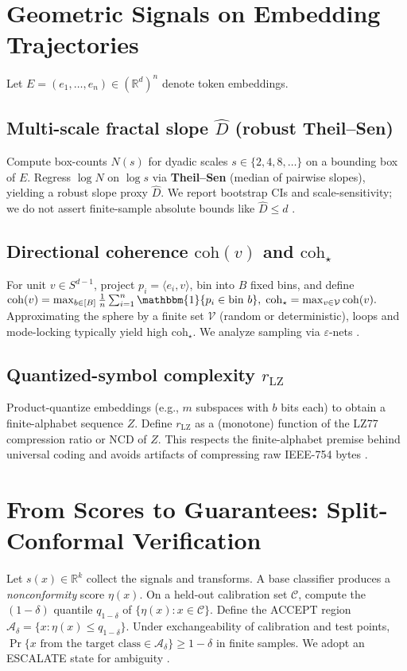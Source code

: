 \documentclass[11pt]{article}
\begin{document}
\section{Geometric Signals on Embedding Trajectories}
Let $E=(e_1,\dots,e_n)\in(\mathbb{R}^d)^n$ denote token embeddings.

\subsection{Multi-scale fractal slope $\hat D$ (robust Theil--Sen)}
Compute box-counts $N(s)$ for dyadic scales $s\in\{2,4,8,\dots\}$ on a bounding box of $E$. Regress $\log N$ on $\log s$ via \textbf{Theil--Sen} (median of pairwise slopes), yielding a robust slope proxy $\hat D$. We report bootstrap CIs and scale-sensitivity; we do not assert finite-sample absolute bounds like $\hat D\le d$ \citep{sen1968}.

\subsection{Directional coherence $\mathrm{coh}(v)$ and $\mathrm{coh}_\star$}
For unit $v\in S^{d-1}$, project $p_i=\langle e_i,v\rangle$, bin into $B$ fixed bins, and define
$
  \mathrm{coh}(v)=\max_{b\in[B]} \frac{1}{n}\sum_{i=1}^n \mathbbm{1}\{p_i\in \text{bin }b\},\;
  \mathrm{coh}_\star = \max_{v\in\mathcal{V}} \mathrm{coh}(v).
$
Approximating the sphere by a finite set $\mathcal{V}$ (random or deterministic), loops and mode-locking typically yield high $\mathrm{coh}_\star$.
We analyze sampling via $\varepsilon$-nets \citep{vershynin2018hdp}.

\subsection{Quantized-symbol complexity $r_{\mathrm{LZ}}$}
Product-quantize embeddings (e.g., $m$ subspaces with $b$ bits each) to obtain a finite-alphabet sequence $Z$. Define $r_{\mathrm{LZ}}$ as a (monotone) function of the LZ77 compression ratio or NCD of $Z$. This respects the finite-alphabet premise behind universal coding and avoids artifacts of compressing raw IEEE-754 bytes \citep{ziv1978,shannon1948}.

\section{From Scores to Guarantees: Split-Conformal Verification}
Let $s(x)\in\mathbb{R}^k$ collect the signals and transforms. A base classifier produces a \emph{nonconformity} score $\eta(x)$. On a held-out calibration set $\mathcal{C}$, compute the $(1-\delta)$ quantile $q_{1-\delta}$ of $\{\eta(x):x\in\mathcal{C}\}$. Define the \textsc{ACCEPT} region $\mathcal{A}_\delta=\{x:\eta(x)\le q_{1-\delta}\}$. Under exchangeability of calibration and test points, $\Pr\{x\text{ from the target class}\in\mathcal{A}_\delta\}\ge 1-\delta$ in finite samples. We adopt an \textsc{ESCALATE} state for ambiguity \citep{angelopoulos2023gentle,oliveira2024nonexchangeable}.
\end{document}
